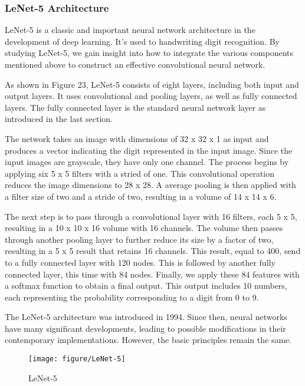 \documentclass{article}
\begin{document}
\newpage
\subsubsection{LeNet-5 Architecture}

LeNet-5 is a classic and important neural network architecture in the development of deep learning. It’s used to handwriting digit recognition. By studying LeNet-5, we gain insight into how to integrate the various components mentioned above to construct an effective convolutional neural network.

As shown in Figure 23, LeNet-5 consists of eight layers, including both input and output layers. It uses convolutional and pooling layers, as well as fully connected layers. The fully connected layer is the standard neural network layer as introduced in the last section.

The network takes an image with dimensions of 32 x 32 x 1 as input and produces a vector indicating the digit represented in the input image. Since the input images are grayscale, they have only one channel. The process begins by applying six 5 x 5 filters with a stried of one. This convolutional operation reduces the image dimensions to 28 x 28. A average pooling is then applied with a filter size of two and a stride of two, resulting in a volume of 14 x 14 x 6.

The next step is to pass through a convolutional layer with 16 filters, each 5 x 5, resulting in a 10 x 10 x 16 volume with 16 channels. The volume then passes through another pooling layer to further reduce its size by a factor of two, resulting in a 5 x 5 result that retains 16 channels. This result, equal to 400, send to a fully connected layer with 120 nodes. This is followed by another fully connected layer, this time with 84 nodes. Finally, we apply these 84 features with a softmax function to obtain a final output. This output includes 10 numbers, each representing the probability corresponding to a digit from 0 to 9.

The LeNet-5 architecture was introduced in 1994. Since then, neural networks have many significant developments, leading to possible modifications in their contemporary implementations. However, the basic principles remain the same.


\begin{figure}[htbp]
        \centering
        \texttt{[image: figure/LeNet-5]}
        \caption{LeNet-5}
     \end{figure}
     
\end{document}
